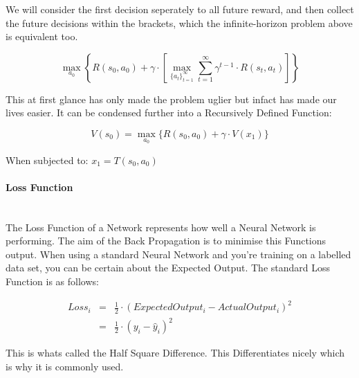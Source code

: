 \begin{flushleft}
                    We will consider the first decision seperately to all future reward, and then collect the future decisions within the brackets, which the infinite-horizon problem
                    above is equivalent too.

                    \[ \max_{a_{0}} \left\{ R(s_0, a_0) + \gamma \cdot \left[ \max_{\{a_{t}\}_{t=1}^{\infty}} \sum_{t=1}^{\infty} \gamma^{t-1} \cdot R(s_{t},a_{t})\right] \right\} \]
                    \vspace{0.2cm}

                    This at first glance has only made the problem uglier but infact has made our lives easier. It can be condensed further into a Recursively Defined Function:
                    \vspace{0.2cm}

                    \[ V(s_{0}) = \max_{a_{0}} \{ R(s_{0}, a_{0}) + \gamma \cdot V(x_{1}) \} \] 
                    \centerline{When subjected to: $ x_{1} = T(s_{0}, a_{0})$}
                    \vspace{0.2cm}

                \paragraph{Loss Function} \mbox{} \\
                    \vspace{0.2cm}
                    The Loss Function of a Network represents how well a Neural Network is performing. The aim of the Back Propagation is to minimise this Functions output. When using
                    a standard Neural Network and you're training on a labelled data set, you can be certain about the Expected Output. The standard Loss Function is as follows: \\ 
                    \vspace{0.2cm}
                    
                    \begin{eqnarray*}
                        Loss_{i} &=& \frac{1}{2} \cdot (Expected Output_{i} - Actual Output_{i})^{2} \\
                        &=& \frac{1}{2} \cdot (y_{i} - \hat{y}_{i})^{2}
                    \end{eqnarray*}
                    \vspace{0.2cm}

                    This is whats called the Half Square Difference. This Differentiates nicely which is why it is commonly used. \\
                    \vspace{0.2cm}


\end{flushleft}

